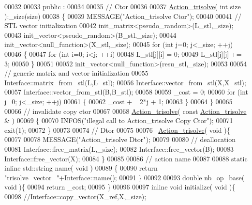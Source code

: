 \begin{DoxyCode}
00032 
00033 public :
00034 
00035   \textcolor{comment}{// Ctor}
00036 
00037   \hyperlink{class_action__trisolve}{Action\_trisolve}( \textcolor{keywordtype}{int} size ):\_size(size)
00038   \{
00039     MESSAGE(\textcolor{stringliteral}{"Action\_trisolve Ctor"});
00040 
00041     \textcolor{comment}{// STL vector initialization}
00042     init\_matrix<pseudo\_random>(L\_stl,\_size);
00043     init\_vector<pseudo\_random>(B\_stl,\_size);
00044     init\_vector<null\_function>(X\_stl,\_size);
00045     \textcolor{keywordflow}{for} (\textcolor{keywordtype}{int} j=0; j<\_size; ++j)
00046     \{
00047       \textcolor{keywordflow}{for} (\textcolor{keywordtype}{int} i=0; i<j; ++i)
00048         L\_stl[j][i] = 0;
00049       L\_stl[j][j] += 3;
00050     \}
00051 
00052     init\_vector<null\_function>(resu\_stl,\_size);
00053 
00054     \textcolor{comment}{// generic matrix and vector initialization}
00055     Interface::matrix\_from\_stl(L,L\_stl);
00056     Interface::vector\_from\_stl(X,X\_stl);
00057     Interface::vector\_from\_stl(B,B\_stl);
00058 
00059     \_cost = 0;
00060     \textcolor{keywordflow}{for} (\textcolor{keywordtype}{int} j=0; j<\_size; ++j)
00061     \{
00062       \_cost += 2*j + 1;
00063     \}
00064   \}
00065 
00066   \textcolor{comment}{// invalidate copy ctor}
00067 
00068   \hyperlink{class_action__trisolve}{Action\_trisolve}( \textcolor{keyword}{const}  \hyperlink{class_action__trisolve}{Action\_trisolve} & )
00069   \{
00070     INFOS(\textcolor{stringliteral}{"illegal call to Action\_trisolve Copy Ctor"});
00071     exit(1);
00072   \}
00073 
00074   \textcolor{comment}{// Dtor}
00075 
00076   ~\hyperlink{class_action__trisolve}{Action\_trisolve}( \textcolor{keywordtype}{void} )\{
00077 
00078     MESSAGE(\textcolor{stringliteral}{"Action\_trisolve Dtor"});
00079 
00080     \textcolor{comment}{// deallocation}
00081     Interface::free\_matrix(L,\_size);
00082     Interface::free\_vector(B);
00083     Interface::free\_vector(X);
00084   \}
00085 
00086   \textcolor{comment}{// action name}
00087 
00088   \textcolor{keyword}{static} \textcolor{keyword}{inline} std::string name( \textcolor{keywordtype}{void} )
00089   \{
00090     \textcolor{keywordflow}{return} \textcolor{stringliteral}{"trisolve\_vector\_"}+Interface::name();
00091   \}
00092 
00093   \textcolor{keywordtype}{double} nb\_op\_base( \textcolor{keywordtype}{void} )\{
00094     \textcolor{keywordflow}{return} \_cost;
00095   \}
00096 
00097   \textcolor{keyword}{inline} \textcolor{keywordtype}{void} initialize( \textcolor{keywordtype}{void} )\{
00098     \textcolor{comment}{//Interface::copy\_vector(X\_ref,X,\_size);}

\end{DoxyCode}
